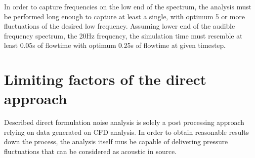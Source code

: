 






In order to capture frequencies on the low end of the spectrum, the analysis must be performed long enough to capture at least a single, with optimum 5 or more fluctuations of the desired low frequency. Assuming lower end of the audible frequency spectrum, the 20Hz frequency, the simulation time must resemble at least 0.05s of flowtime with optimum 0.25s of flowtime at given timestep.


\section{Limiting factors of the direct approach} \label{limits}
Described direct formulation noise analysis is solely a post processing approach relying on data generated on CFD analysis. In order to obtain reasonable results down the process, the analysis itself mus be capable of delivering pressure fluctuations that can be considered as acoustic in source. 

